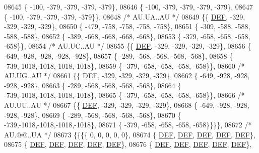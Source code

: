 \begin{DoxyCode}
08645 \{ -100, -379, -379, -379, -379\},
08646 \{ -100, -379, -379, -379, -379\},
08647 \{ -100, -379, -379, -379, -379\}\},
08648 \textcolor{comment}{/* AU.UA..AU */}
08649 \{\{  \mbox{\hyperlink{1_88_84__epars_8h_a397419fc12b37ed479c8abb9d444d843}{DEF}}, -329, -329, -329, -329\},
08650 \{ -479, -758, -758, -758, -758\},
08651 \{ -309, -588, -588, -588, -588\},
08652 \{ -389, -668, -668, -668, -668\},
08653 \{ -379, -658, -658, -658, -658\}\},
08654 \textcolor{comment}{/* AU.UC..AU */}
08655 \{\{  \mbox{\hyperlink{1_88_84__epars_8h_a397419fc12b37ed479c8abb9d444d843}{DEF}}, -329, -329, -329, -329\},
08656 \{ -649, -928, -928, -928, -928\},
08657 \{ -289, -568, -568, -568, -568\},
08658 \{ -739,-1018,-1018,-1018,-1018\},
08659 \{ -379, -658, -658, -658, -658\}\},
08660 \textcolor{comment}{/* AU.UG..AU */}
08661 \{\{  \mbox{\hyperlink{1_88_84__epars_8h_a397419fc12b37ed479c8abb9d444d843}{DEF}}, -329, -329, -329, -329\},
08662 \{ -649, -928, -928, -928, -928\},
08663 \{ -289, -568, -568, -568, -568\},
08664 \{ -739,-1018,-1018,-1018,-1018\},
08665 \{ -379, -658, -658, -658, -658\}\},
08666 \textcolor{comment}{/* AU.UU..AU */}
08667 \{\{  \mbox{\hyperlink{1_88_84__epars_8h_a397419fc12b37ed479c8abb9d444d843}{DEF}}, -329, -329, -329, -329\},
08668 \{ -649, -928, -928, -928, -928\},
08669 \{ -289, -568, -568, -568, -568\},
08670 \{ -739,-1018,-1018,-1018,-1018\},
08671 \{ -379, -658, -658, -658, -658\}\}\}\},
08672 \textcolor{comment}{/* AU.@@..UA */}
08673 \{\{\{\{    0,    0,    0,    0,    0\},
08674 \{  \mbox{\hyperlink{1_88_84__epars_8h_a397419fc12b37ed479c8abb9d444d843}{DEF}},  \mbox{\hyperlink{1_88_84__epars_8h_a397419fc12b37ed479c8abb9d444d843}{DEF}},  \mbox{\hyperlink{1_88_84__epars_8h_a397419fc12b37ed479c8abb9d444d843}{DEF}},  \mbox{\hyperlink{1_88_84__epars_8h_a397419fc12b37ed479c8abb9d444d843}{DEF}},  \mbox{\hyperlink{1_88_84__epars_8h_a397419fc12b37ed479c8abb9d444d843}{DEF}}\},
08675 \{  \mbox{\hyperlink{1_88_84__epars_8h_a397419fc12b37ed479c8abb9d444d843}{DEF}},  \mbox{\hyperlink{1_88_84__epars_8h_a397419fc12b37ed479c8abb9d444d843}{DEF}},  \mbox{\hyperlink{1_88_84__epars_8h_a397419fc12b37ed479c8abb9d444d843}{DEF}},  \mbox{\hyperlink{1_88_84__epars_8h_a397419fc12b37ed479c8abb9d444d843}{DEF}},  \mbox{\hyperlink{1_88_84__epars_8h_a397419fc12b37ed479c8abb9d444d843}{DEF}}\},
08676 \{  \mbox{\hyperlink{1_88_84__epars_8h_a397419fc12b37ed479c8abb9d444d843}{DEF}},  \mbox{\hyperlink{1_88_84__epars_8h_a397419fc12b37ed479c8abb9d444d843}{DEF}},  \mbox{\hyperlink{1_88_84__epars_8h_a397419fc12b37ed479c8abb9d444d843}{DEF}},  \mbox{\hyperlink{1_88_84__epars_8h_a397419fc12b37ed479c8abb9d444d843}{DEF}},  \mbox{\hyperlink{1_88_84__epars_8h_a397419fc12b37ed479c8abb9d444d843}{DEF}}\},

\end{DoxyCode}
